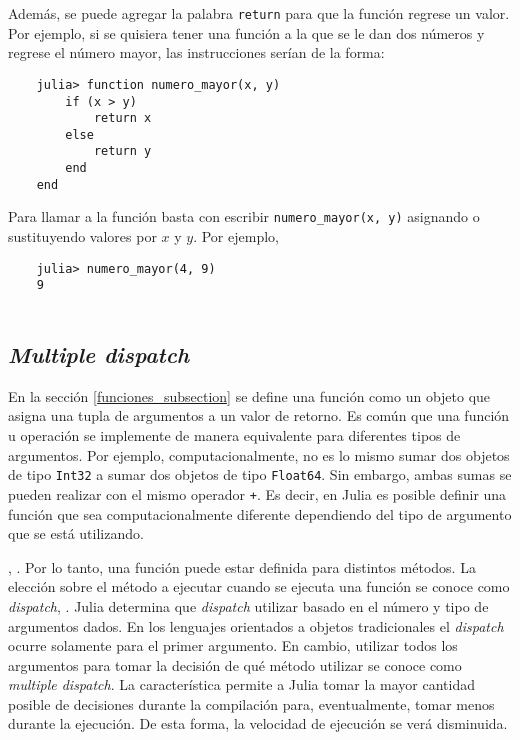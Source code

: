 Además, se puede agregar la palabra \texttt{return} para que la función regrese un valor. Por ejemplo, si se quisiera tener una función a la que se le dan dos números y regrese el número mayor, las instrucciones serían de la forma:

\begin{verbatim}
	julia> function numero_mayor(x, y)
		if (x > y)
			return x
		else
			return y
		end
	end
\end{verbatim}


Para llamar a la función basta con escribir \texttt{numero\_mayor(x, y)} asignando o sustituyendo valores por $x$ y $y$. Por ejemplo,

\begin{verbatim}
	julia> numero_mayor(4, 9)
	9
	
\end{verbatim}

\subsection{\textit{Multiple dispatch}} \label{subMultipleDispatch}
En la sección \ref{funciones_subsection} se define una función como un objeto que asigna una tupla de argumentos a un valor de retorno. Es común que una función u operación se implemente de manera equivalente para diferentes tipos de argumentos. Por ejemplo, computacionalmente, no es lo mismo sumar dos objetos de tipo \texttt{Int32} a sumar dos objetos de tipo \texttt{Float64}. Sin embargo, ambas sumas se pueden realizar con el mismo operador \texttt{+}. Es decir, en \textsf{Julia} es posible definir una función que sea computacionalmente diferente dependiendo del tipo de argumento que se está utilizando.

, \cite{manual_Julia}. Por lo tanto, una función puede estar definida para distintos métodos. La elección sobre el método a ejecutar cuando se ejecuta una función se conoce como \textit{dispatch}, \cite{manual_Julia}. \textsf{Julia} determina que \textit{dispatch} utilizar basado en el número y tipo de argumentos dados. En los lenguajes orientados a objetos tradicionales el \textit{dispatch} ocurre solamente para el primer argumento. En cambio, utilizar todos los argumentos para tomar la decisión de qué método utilizar se conoce como \textit{multiple dispatch}. La característica permite a \textsf{Julia} tomar la mayor cantidad posible de decisiones durante la compilación para, eventualmente, tomar menos durante la ejecución. De esta forma, la velocidad de ejecución se verá disminuida. 

